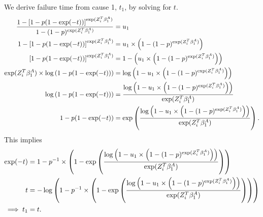 We derive failure time from cause 1, $t_1$, by solving for $t$.
\begin{align*}
\frac{1 - \left[1 - p(1 - \exp(-t))\right]^{\exp(Z_i^T\beta_1^A)}}{1 - (1 - p)^{\exp(Z_i^T\beta_1^A)}} &= u_1 \\
1 - \left[1 - p(1 - \exp(-t))\right]^{\exp(Z_i^T\beta_1^A)} &= u_1 \times \left(1 - (1 - p)^{\exp(Z_i^T\beta_1^A)}\right) \\
\left[1 - p(1 - \exp(-t))\right]^{\exp(Z_i^T\beta_1^A)} &= 1 - \left( u_1 \times \left(1 - (1 - p)^{\exp(Z_i^T\beta_1^A)}\right)\right) \\
\exp(Z_i^T\beta_1^A) \times \log\left(1 - p(1 - \exp(-t))\right) &= \log\left(1 - u_1 \times \left(1 - (1 - p)^{\exp(Z_i^T\beta_1^A)}\right)\right) \\
\log\left(1 - p(1 - \exp(-t))\right) &= \frac{\log\left(1 - u_1 \times \left(1 - (1 - p)^{\exp(Z_i^T\beta_1^A)}\right)\right)}{\exp(Z_i^T\beta_1^A)} \\
1 - p(1 - \exp(-t)) &= \exp\left(\frac{\log\left(1 - u_1 \times \left(1 - (1 - p)^{\exp(Z_i^T\beta_1^A)}\right)\right)}{\exp(Z_i^T\beta_1^A)}\right).
\end{align*}
This implies
\begin{align*}
\exp(-t) &= 1 - p^{-1} \times \left(1 - \exp\left(\frac{\log\left(1 - u_1 \times \left(1 - (1 - p)^{\exp(Z_i^T\beta_1^A)}\right)\right)}{\exp(Z_i^T\beta_1^A)}\right)\right) \\
t &= -\log\left(1 - p^{-1} \times \left(1 - \exp\left(\frac{\log\left(1 - u_1 \times \left(1 - (1 - p)^{\exp(Z_i^T\beta_1^A)}\right)\right)}{\exp(Z_i^T\beta_1^A)}\right)\right)\right) \\
\implies t_1 &= t.
\end{align*}

